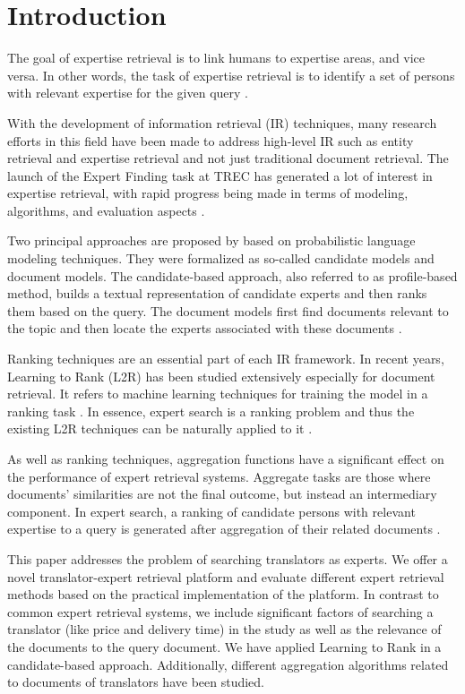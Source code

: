 \section{Introduction}
\label{sec:introduction}
The goal of expertise retrieval is to link humans to expertise areas, and vice versa. In other words, the task of expertise retrieval is to identify a set of persons with relevant expertise for the given query \citep{er, er-community-aware}.

With the development of information retrieval (IR) techniques, many research efforts in this field have been made to address high-level IR such as entity retrieval and expertise retrieval \citep{er-sparse}  and not just traditional document retrieval. The launch of the Expert Finding task at TREC has generated a lot of interest in expertise retrieval, with rapid progress being made in terms of modeling, algorithms, and evaluation aspects \citep{trec2005, er-community-aware}.

Two principal approaches are proposed by \citet{trec2005} based on probabilistic language modeling techniques. They were formalized as so-called candidate models and document models. The candidate-based approach, also referred to as profile-based method, builds a textual representation of candidate experts and then ranks them based on the query. The document models first find documents relevant to the topic and then locate the experts associated with these documents \citep{er}.

Ranking techniques are an essential part of each IR framework. In recent years, Learning to Rank (L2R) has been studied extensively especially for document retrieval. It refers to machine learning techniques for training the model in a ranking task \citep{er}. In essence, expert search is a ranking problem and thus the existing L2R techniques can be naturally applied to it \citep{l2r-intro}.

As well as ranking techniques, aggregation functions have a significant effect on the performance of expert retrieval systems. Aggregate tasks are those where documents' similarities are not
the final outcome, but instead an intermediary component. In expert search, a ranking of candidate persons with relevant expertise to a query is generated after aggregation of their related documents \citep{agg-learning}.

This paper addresses the problem of searching translators as experts. We offer a novel translator-expert retrieval platform and evaluate different expert retrieval methods based on the practical implementation of the platform. In contrast to common expert retrieval systems, we include significant factors of searching a translator (like price and delivery time) in the study as well as the relevance of the documents to the query document. We have applied Learning to Rank in a candidate-based approach. Additionally, different aggregation algorithms related to documents of translators have been studied.

